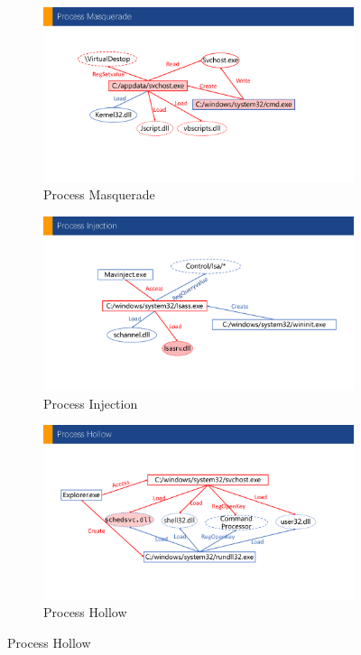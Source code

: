 \begin{figure}
  \centering
  \begin{minipage}[b]{0.65\textwidth} 
  \begin{subfigure}{.5\textwidth}
      \includegraphics[width=\textwidth]{figs/Process Masquerade.pdf}
      \caption{Process Masquerade}
      \label{fig:process_mas}

  \end{subfigure}
  \hfill
  \begin{subfigure}{.5\textwidth}
      \includegraphics[width=\textwidth]{figs/process_injection.pdf}
      \caption{Process Injection}
      \label{fig:process_inj}

  \end{subfigure}

  \begin{subfigure}{.5\textwidth}
      \includegraphics[width=\textwidth]{figs/Process Hollow.pdf}
      \caption{Process Hollow}
      \label{fig:hollow}


\end{subfigure}
\end{minipage}
\end{figure}
